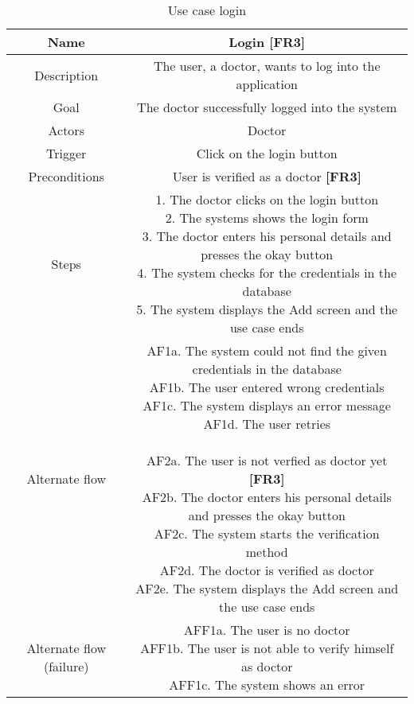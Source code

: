 \begin{table}[H]
	\begin{center}\scriptsize
		\begin{tabular}{ |c|c| } 
			\hline	
			Name & Login \textbf{[FR3]}\\ 
			\hline	
			Description & The user, a doctor, wants to log into the application \\ 
			\hline
			Goal & The doctor successfully logged into the system \\ 
			\hline
			Actors & Doctor \\ 
			\hline
			Trigger & Click on the login button \\ 
			\hline
			Preconditions & User is verified as a doctor \textbf{[FR3]} \\ 
			\hline
			Steps & \parbox{9cm}{\vspace{.5\baselineskip}
				1. The doctor clicks on the login button\\
				2. The systems shows the login form\\
				3. The doctor enters his personal details and presses the okay button\\
				4. The system checks for the credentials in the database\\
				5. The system displays the Add screen and the use case ends\\}\\
			\hline
			Alternate flow & \parbox{9cm}{\vspace{.5\baselineskip}
				AF1a. The system could not find the given credentials in the database\\
				AF1b. The user entered wrong credentials\\
				AF1c. The system displays an error message\\
				AF1d. The user retries\\\\
				AF2a. The user is not verfied as doctor yet \textbf{[FR3]}\\
				AF2b. The doctor enters his personal details and presses the okay button\\
				AF2c. The system starts the verification method\\
				AF2d. The doctor is verified as doctor\\
				AF2e. The system displays the Add screen and the use case ends\\}\\ 
			\hline
			Alternate flow (failure) & \parbox{9cm}{\vspace{.5\baselineskip}
				AFF1a. The user is no doctor\\
				AFF1b. The user is not able to verify himself as doctor\\
				AFF1c. The system shows an error}\\
			\hline
		\end{tabular}
	\end{center}\normalsize
	\caption{Use case login}
\end{table}
